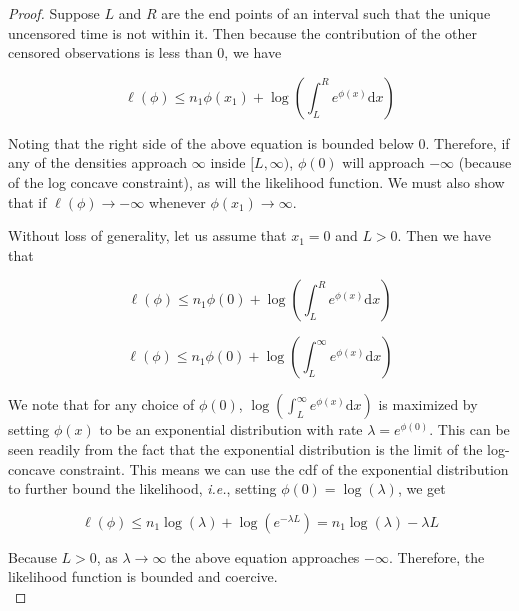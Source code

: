 \begin{proof}
	Suppose $L$ and $R$ are the end points of an interval such that the unique uncensored time is not within it. Then because the contribution of the other censored observations is less than 0, we have
	
	\[
	\ell(\phi) \leq n_1 \phi(x_1) + \log \left( \displaystyle \int_L^R e^{\phi(x)} \mathrm{d}x \right)
	\]
	
	Noting that the right side of the above equation is bounded below 0. Therefore, if any of the densities approach $\infty$ inside $[L, \infty)$, $\phi(0)$ will approach $-\infty$ (because of the log concave constraint), as will the likelihood function. We must also show that if $\ell(\phi) \rightarrow -\infty$ whenever $\phi(x_1) \rightarrow \infty$. 
	
	Without loss of generality, let us assume that $x_1 = 0$ and $L > 0$. Then we have that 
	
	\[
	 \ell(\phi) \leq n_1 \phi(0) + \log \left( \displaystyle \int_L^R e^{\phi(x)} \mathrm{d}x \right) 
	\]
	
	\[
	\ell(\phi) \leq n_1 \phi(0) + \log \left( \displaystyle \int_L^\infty e^{\phi(x)} \mathrm{d}x \right)
	\]

	We note that for any choice of $\phi(0)$, $\log \left( \displaystyle \int_L^\infty e^{\phi(x)} \mathrm{d}x \right) $ is maximized by setting $\phi(x)$ to be an exponential distribution with rate $\lambda = e^{\phi(0)}$. This can be seen readily from the fact that the exponential distribution is the limit of the log-concave constraint. This means we can use the cdf of the exponential distribution to further bound the likelihood, \emph{i.e.}, setting $\phi(0) = \log(\lambda)$, we get 
	
	\[
	\ell(\phi) \leq n_1 \log(\lambda) + \log( e^{- \lambda L} ) = n_1 \log(\lambda) - \lambda L
	\]
	
	Because $L > 0$, as $\lambda \rightarrow \infty$ the above equation approaches $-\infty$. Therefore, the likelihood function is bounded and coercive. 
	\\
	\end{proof}



